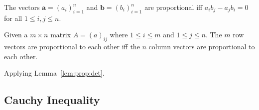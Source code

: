 \begin{lem} \label{lem:prop:det}
The vectors \(\mathbf{a} = (a_i)_{i=1}^n\)
and \(\mathbf{b} = (b_i)_{i=1}^n\) are proportional
iff \(a_i b_j - a_j b_i = 0\) for all \(1\leq i,j \leq n\).
\end{lem}


\begin{lem}
Given a \(m\times n\) matrix \(A = (a)_{ij}\) where \(1\leq i \leq m\)
and \(1\leq j \leq n\).
The $m$ row vectors are proportional to each other
iff
the $n$ column vectors are proportional to each other.
\end{lem}
\begin{thmproof}
Applying Lemma~\ref{lem:prop:det}.
\end{thmproof}



\subsection{Cauchy Inequality}


